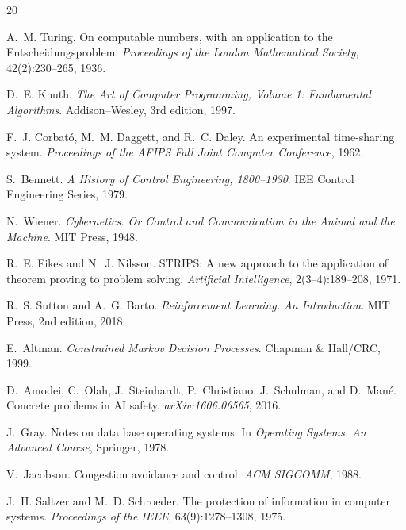 \begin{thebibliography}{20}

A.~M. Turing.
\newblock On computable numbers, with an application to the Entscheidungsproblem.
\newblock \emph{Proceedings of the London Mathematical Society}, 42(2):230--265,
1936.

D.~E. Knuth.
\newblock \emph{The Art of Computer Programming, Volume 1: Fundamental Algorithms}.
\newblock Addison--Wesley, 3rd edition, 1997.

F.~J. Corbató, M.~M. Daggett, and R.~C. Daley.
\newblock An experimental time-sharing system.
\newblock \emph{Proceedings of the AFIPS Fall Joint Computer Conference}, 1962.

S.~Bennett.
\newblock \emph{A History of Control Engineering, 1800--1930}.
\newblock IEE Control Engineering Series, 1979.

N.~Wiener.
\newblock \emph{Cybernetics. Or Control and Communication in the Animal and the
Machine}.
\newblock MIT Press, 1948.

R.~E. Fikes and N.~J. Nilsson.
\newblock STRIPS: A new approach to the application of theorem proving to problem
solving.
\newblock \emph{Artificial Intelligence}, 2(3--4):189--208, 1971.

R.~S. Sutton and A.~G. Barto.
\newblock \emph{Reinforcement Learning. An Introduction}.
\newblock MIT Press, 2nd edition, 2018.

E.~Altman.
\newblock \emph{Constrained Markov Decision Processes}.
\newblock Chapman \& Hall/CRC, 1999.

D.~Amodei, C.~Olah, J.~Steinhardt, P.~Christiano, J.~Schulman, and D.~Mané.
\newblock Concrete problems in AI safety.
\newblock \emph{arXiv:1606.06565}, 2016.

J.~Gray.
\newblock Notes on data base operating systems.
\newblock In \emph{Operating Systems. An Advanced Course}, Springer, 1978.

V.~Jacobson.
\newblock Congestion avoidance and control.
\newblock \emph{ACM SIGCOMM}, 1988.

J.~H. Saltzer and M.~D. Schroeder.
\newblock The protection of information in computer systems.
\newblock \emph{Proceedings of the IEEE}, 63(9):1278--1308, 1975.



\end{thebibliography}
